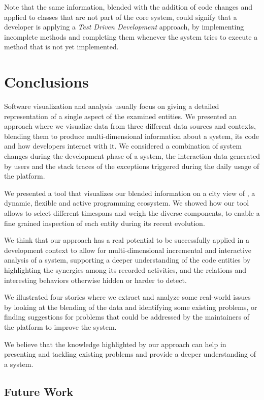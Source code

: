 Note that the same information, blended with the addition of code changes and applied to classes that are not part of the core system, could signify that a developer is applying a \textit{Test Driven Development} approach, by implementing incomplete methods and completing them whenever the system tries to execute a method that is not yet implemented.



\section{Conclusions}\label{sec:conclusions}

Software visualization and analysis usually focus on giving a detailed representation of a single aspect of the examined entities. We presented an approach where we visualize data from three different data sources and contexts, blending them to produce multi-dimensional information about a system, its code and how developers interact with it. We considered a combination of system changes during the development phase of a system, the interaction data generated by users and the stack traces of the exceptions triggered during the daily usage of the platform.

We presented a tool that visualizes our blended information on a city view of \pha, a dynamic, flexible and active programming ecosystem. We showed how our tool allows to select different timespans and weigh the diverse components, to enable a fine grained inspection of each entity during its recent evolution.

We think that our approach has a real potential to be successfully applied in a development context to allow for multi-dimensional incremental and interactive analysis of a system, supporting a deeper understanding of the code entities by highlighting the synergies among its recorded activities, and the relations and interesting behaviors otherwise hidden or harder to detect.

We illustrated four stories where we extract and analyze some real-world issues by looking at the blending of the data and identifying some existing problems, or finding suggestions for problems that could be addressed by the maintainers of the platform to improve the system.

We believe that the knowledge highlighted by our approach can help in presenting and tackling existing problems and provide a deeper understanding of a system.

\subsection*{Future Work}

